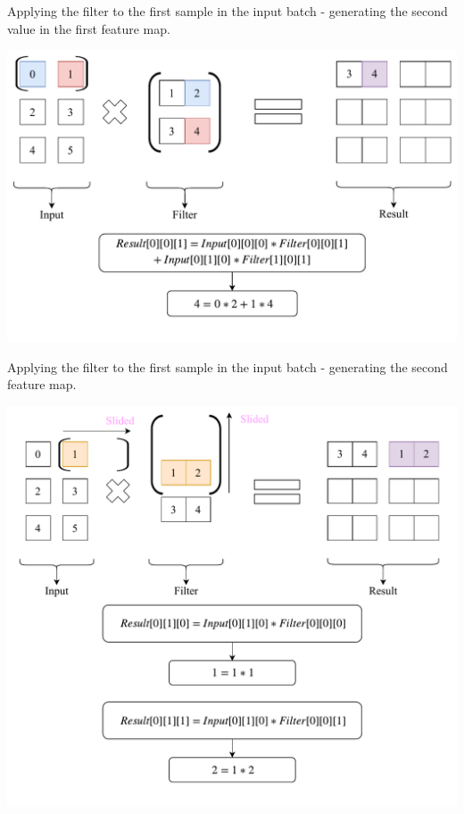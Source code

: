 \documentclass[12pt]{article}
\begin{document}
\begin{blockfigure}{ Applying the filter to the first sample in the input batch - generating the second value in the first feature map.}
	\begin{center}
		\includegraphics[width=\textwidth]{firstConvSample_step2}
	\end{center}
\end{blockfigure}
\newpage
\begin{blockfigure}{ Applying the filter to the first sample in the input batch - generating the second feature map.}
	\begin{center}
		\includegraphics[width=\textwidth]{firstConvSample_step3}
	\end{center}
\end{blockfigure}
\end{document}
